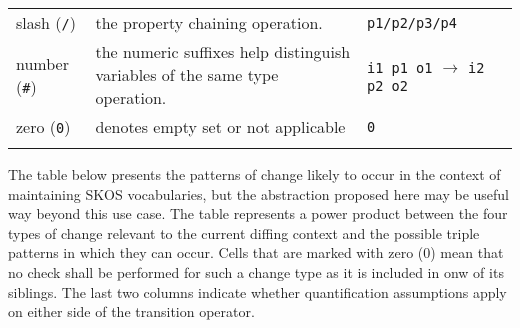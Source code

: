 \begin{longtable}[c]{@{}p{4cm}p{7cm}p{3cm}l@{}}
  slash (\texttt{/})                    & the property chaining operation.                                                                                                                           & \texttt{p1/p2/p3/p4}                                     \\
  number (\texttt{\#})                  & the numeric suffixes help distinguish variables of the same type	operation.                                                                                 & \texttt\texttt{i1 p1 o1} $\rightarrow$ \texttt{i2 p2 o2} \\
  zero (\texttt{0})                     & denotes empty set or not applicable                                                                                                                        & \texttt{0}                                               \\* \bottomrule
  \label{tab:rdf-differ-query-conventions}                                                                                                                                                                                                                      \\
\end{longtable}

The table below presents the patterns of change likely to occur in the context of maintaining SKOS vocabularies, but the abstraction proposed here may be useful way beyond this use case. The table represents a power product between the four types of change relevant to the current diffing context and the possible triple patterns in which they can occur. Cells that are marked with zero (0) mean that no check shall be performed for such a change type as it is included in onw of its siblings. The last two columns indicate whether quantification assumptions apply on either side of the transition operator.

